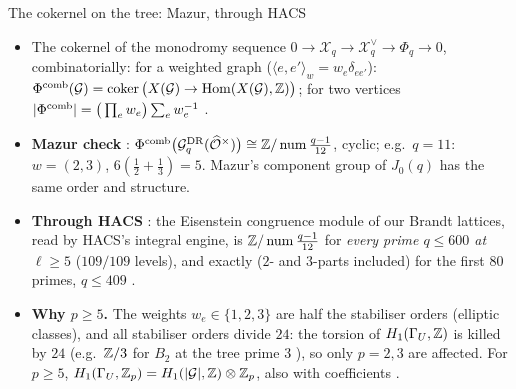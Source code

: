 \begin{frame}{The cokernel on the tree: Mazur, through HACS}
  \small
  \begin{itemize}\setlength{\itemsep}{0pt}
    \item The cokernel of the monodromy sequence $0\to\mathcal X_q\to\mathcal X_q^\vee\to\Phi_q\to0$, combinatorially: for a weighted graph ($\langle e,e'\rangle_w=w_e\delta_{ee'}$):
      $\Phi^{\mathrm{comb}}(\mathcal G)=\operatorname{coker}\big(X(\mathcal G)\to\operatorname{Hom}(X(\mathcal G),\mathbb{Z})\big)$; for two vertices
      $|\Phi^{\mathrm{comb}}|=\big(\prod_e w_e\big)\sum_e w_e^{-1}$ .
    \item \textbf{Mazur check} : $\Phi^{\mathrm{comb}}\big(\mathcal G^{\mathrm{DR}}_q(\widehat{\mathcal O}^\times)\big)\cong\mathbb{Z}/\operatorname{num}\frac{q-1}{12}$, cyclic;
      e.g.\ $q=11$: $w=(2,3)$, $6(\frac12+\frac13)=5$. Mazur's component group of $J_0(q)$  has the same order and structure.
    \item \textbf{Through HACS} : the Eisenstein congruence module of our Brandt lattices, read by HACS's integral engine, is
      $\mathbb{Z}/\operatorname{num}\frac{q-1}{12}$ for \emph{every prime $q\le600$ at $\ell\ge5$} ($109/109$ levels), and exactly
      ($2$- and $3$-parts included) for the first $80$ primes, $q\le409$ .
    \item \textbf{Why $p\ge5$.} The weights $w_e\in\{1,2,3\}$ are half the stabiliser orders (elliptic classes),
      and all stabiliser orders divide $24$: the torsion of $H_1(\Gamma_U,\mathbb{Z})$ is killed by $24$ (e.g.\ $\mathbb{Z}/3$ for $B_2$ at the tree
      prime $3$ ), so only $p=2,3$ are affected. For $p\ge5$, $H_1(\Gamma_U,\mathbb{Z}_p)=H_1(|\mathcal G|,\mathbb{Z})\otimes\mathbb{Z}_p$, also with
      coefficients .
  \end{itemize}
\end{frame}
